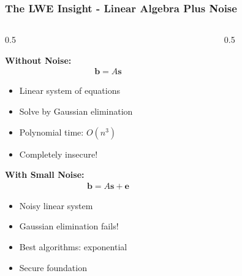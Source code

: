 \documentclass[aspectratio=169,10pt]{beamer}
\newcommand{\slideheader}[1]{\frametitle{#1}}
\theoremstyle{plain}
\begin{document}
\begin{frame}
  \slideheader{The LWE Insight - Linear Algebra Plus Noise}
  
  \begin{columns}[T]
    \begin{column}{0.5\textwidth}

    \textbf{Without Noise:}
    \begin{align}
      \mathbf{b} = A\mathbf{s}
    \end{align}
    
    \begin{itemize}
      \item Linear system of equations
      \item Solve by Gaussian elimination
      \item Polynomial time: $O(n^3)$
      \item Completely insecure!
    \end{itemize}
    
    \vspace{0.5cm}
    
    \textbf{With Small Noise:}
    \begin{align}
      \mathbf{b} = A\mathbf{s} + \mathbf{e}
    \end{align}
    
    \begin{itemize}
      \item Noisy linear system
      \item Gaussian elimination fails!
      \item Best algorithms: exponential
      \item Secure foundation
    \end{itemize}
  
    \end{column}
    \begin{column}{0.5\textwidth}

\end{column}
\end{columns}
\end{frame}
\end{document}
